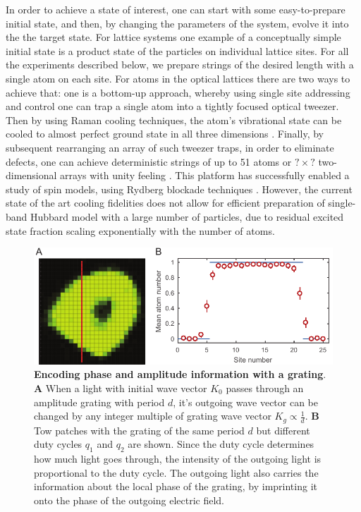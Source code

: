 In order to achieve a state of interest, one can start with some easy-to-prepare initial state, and then, by changing the parameters of the system, evolve it into the the target state. For lattice systems one example of a conceptually simple initial state is a product state of the particles on individual lattice sites. For all the experiments described below, we prepare strings of the desired length with a single atom on each site. For atoms in the optical lattices there are two ways to achieve that: one is a bottom-up approach, whereby using single site addressing and control one can trap a single atom into a tightly focused optical tweezer. Then by using Raman cooling techniques, the atom's vibrational state can be cooled to almost perfect ground state in all three dimensions \cite{adamo, selim}. Finally, by subsequent rearranging an array of such tweezer traps, in order to eliminate defects, one can achieve deterministic strings of up to 51 atoms \cite{misha} or $?\times?$ two-dimensional arrays with unity feeling \cite{broweys}. This platform has successfully enabled a study of spin models, using Rydberg blockade techniques \cite{misha}. However, the current state of the art cooling fidelities does not allow for efficient preparation of single-band Hubbard model with a large number of particles, due to residual excited state fraction scaling exponentially with the number of atoms.

\begin{figure}[t]
	\centering
	\includegraphics[scale=1]{figures/CTE_MI.pdf}
	\caption{{\bf Encoding phase and amplitude information with a grating}. {\bf A} When a light with initial wave vector $K_0$ passes through an amplitude grating with period $d$, it's outgoing wave vector can be changed by any integer multiple of grating wave vector $K_g\propto \frac{1}{d}$. {\bf B} Tow patches with the grating of the same period $d$ but different duty cycles $q_1$ and $q_2$ are shown. Since the duty cycle determines how much light goes through, the intensity of the outgoing light is proportional to the duty cycle. The outgoing light also carries the information about the local phase of the grating, by imprinting it onto the phase of the outgoing electric field.}
	\label{fig:CTE_MI}
\end{figure}


